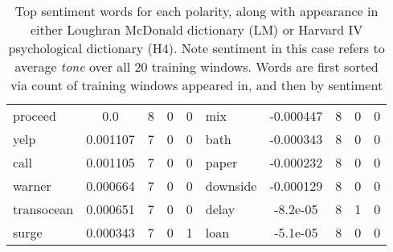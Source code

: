 \documentclass[ oneside,%
                    author={Joshua Felmeden},
                    degree={MEng},
                     title={Sentiment Analysis of Financial Headlines Based on Realised Stock Returns},
                  subtitle={Research}]{dissertation}
\begin{document}
\begin{table}[!ht]
\begin{tabular}{lcccclcccc}
proceed & 0.0 & 8 & 0 & 0 & mix & -0.000447 & 8 & 0 & 0 \\
yelp & 0.001107 & 7 & 0 & 0 & bath & -0.000343 & 8 & 0 & 0 \\
call & 0.001105 & 7 & 0 & 0 & paper & -0.000232 & 8 & 0 & 0 \\
warner & 0.000664 & 7 & 0 & 0 & downside & -0.000129 & 8 & 0 & 0 \\
transocean & 0.000651 & 7 & 0 & 0 & delay & -8.2e-05 & 8 & 1 & 0 \\
surge & 0.000343 & 7 & 0 & 1 & loan & -5.1e-05 & 8 & 0 & 0 \\
\bottomrule
\end{tabular}
\caption[Sentiment word list for unigrams]{Top sentiment words for each polarity, along with appearance in either Loughran McDonald dictionary (LM) or Harvard IV psychological dictionary (H4). Note sentiment in this case refers to average \textit{tone} over all 20 training windows. Words are first sorted via count of training windows appeared in, and then by sentiment}
\end{table}
\end{document}
